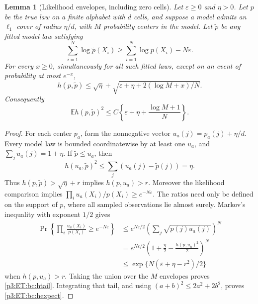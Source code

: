 \documentclass[11pt,a4paper]{article}
\newtheorem{lemma}[theorem]{Lemma}
\theoremstyle{definition}
\theoremstyle{remark}
\numberwithin{equation}{section}
\begin{document}
\begin{lemma}[Likelihood envelopes, including zero cells]
\label{p3:ET:bc:envelopes}
Let $\varepsilon\ge0$ and $\eta>0$. Let $p$ be the true law on a finite alphabet with $d$ cells, and suppose a
model admits an $\ell_1$ cover of radius $\eta/d$, with $M$ probability
centers in the model. Let $\widetilde p$ be any fitted model law satisfying
\[
 \sum_{i=1}^N\log\widetilde p(X_i)
 \ge\sum_{i=1}^N\log p(X_i)-N\varepsilon.
\]
For every $x\ge0$, simultaneously for all such fitted laws, except on an
event of probability at most $e^{-x}$,
\begin{equation}\label{p3:ET:bc:htail}
 h(p,\widetilde p)
 \le\sqrt\eta+
       \sqrt{\varepsilon+\eta+2(\log M+x)/N}.
\end{equation}
Consequently
\begin{equation}\label{p3:ET:bc:hexpect}
 \mathbb E h(p,\widetilde p)^2
 \le C\left\{\varepsilon+\eta+\frac{\log M+1}{N}\right\}.
\end{equation}
\end{lemma}
\begin{proof}
For each center $p_a$, form the nonnegative vector
$u_a(j)=p_a(j)+\eta/d$. Every model law is bounded coordinatewise by at
least one $u_a$, and $\sum_j u_a(j)=1+\eta$. If $\widetilde p\le u_a$,
then
\[
 h(u_a,\widetilde p)^2\le\sum_j(u_a(j)-\widetilde p(j))=\eta.
\]
Thus $h(p,\widetilde p)>\sqrt\eta+r$ implies $h(p,u_a)>r$.
Moreover the likelihood comparison implies
$\prod_i u_a(X_i)/p(X_i)\ge e^{-N\varepsilon}$.
The ratios need only be defined on the support of $p$, where all sampled
observations lie almost surely. Markov's inequality with exponent $1/2$
gives
\begin{align*}
 \Pr\left\{\prod_i\frac{u_a(X_i)}{p(X_i)}
                      \ge e^{-N\varepsilon}\right\}
 &\le e^{N\varepsilon/2}
        \left(\sum_j\sqrt{p(j)u_a(j)}\right)^N\\
 &=e^{N\varepsilon/2}
        \left(1+\frac\eta2-\frac{h(p,u_a)^2}{2}\right)^N\\
 &\le\exp\{N(\varepsilon+\eta-r^2)/2\}
\end{align*}
when $h(p,u_a)>r$. Taking the union over the $M$ envelopes proves
\eqref{p3:ET:bc:htail}. Integrating that tail, and using
$(a+b)^2\le2a^2+2b^2$, proves \eqref{p3:ET:bc:hexpect}.
\end{proof}
\end{document}

